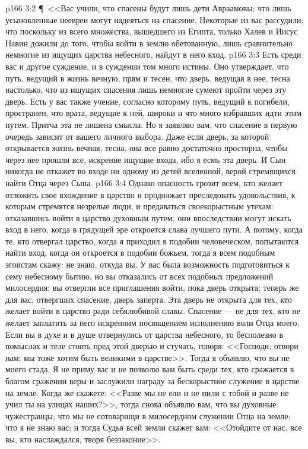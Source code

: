 \vs p166 3:2 \P\ <<Вас учили, что спасены будут лишь дети Авраамовы; что лишь усыновленные неевреи могут надеяться на спасение. Некоторые из вас рассудили, что поскольку из всего множества, вышедшего из Египта, только Халев и Иисус Навин дожили до того, чтобы войти в землю обетованную, лишь сравнительно немногие из ищущих царства небесного, найдут в него вход.
\vs p166 3:3 Есть среди вас и другое суждение, и в суждении том много истины. Оно утверждает, что путь, ведущий в жизнь вечную, прям и тесен, что дверь, ведущая в нее, тесна настолько, что из ищущих спасения лишь немногие сумеют пройти через эту дверь. Есть у вас также учение, согласно которому путь, ведущий к погибели, пространен, что врата, ведущие к ней, широки и что много избравших идти этим путем. Притча эта не лишена смысла. Но я заявляю вам, что спасение в первую очередь зависит от вашего личного выбора. Даже если дверь, за которой открывается жизнь вечная, тесна, она все равно достаточно просторна, чтобы через нее прошли все, искренне ищущие входа, ибо я есмь эта дверь. И Сын никогда не откажет во входе ни одному из детей вселенной, верой стремящихся найти Отца через Сына.
\vs p166 3:4 Однако опасность грозит всем, кто желает отложить свое вхождение в царство и продолжает преследовать удовольствия, к которым стремятся незрелые люди, и предаваться своекорыстным утехам: отказавшись войти в царство духовным путем, они впоследствии могут искать вход в него, когда в грядущей эре откроется слава лучшего пути. А потому, когда те, кто отвергал царство, когда я приходил в подобии человеческом, попытаются найти вход, когда он откроется в подобии божьем, тогда я всем подобным эгоистам скажу: не знаю, откуда вы. У вас была возможность подготовиться к сему небесному бытию, но вы отказались от всех подобных предложений милосердия; вы отвергли все приглашения войти, пока дверь открыта; теперь же для вас, отвергших спасение, дверь заперта. Эта дверь не открыта для тех, кто желает войти в царство ради себялюбивой славы. Спасение --- не для тех, кто не желает заплатить за него искренним посвящением исполнению воли Отца моего. Если вы в духе и в душе отвернулись от царства небесного, то бесполезно в помыслах и теле стоять пред этой дверью и стучать, говоря: <<Господи, отвори нам; мы тоже хотим быть великими в царстве>>. Тогда я объявлю, что вы не моего стада. Я не приму вас и не позволю вам быть среди тех, кто сражается в благом сражении веры и заслужили награду за бескорыстное служение в царстве на земле. Когда же скажете: <<Разве мы не ели и не пили с тобой и разве не учил ты на улицах наших?>>, тогда снова объявлю вам, что вы духовные чужестранцы; что мы не сотоварищи в милосердном служении Отца на земле; что я не знаю вас; и тогда Судья всей земли скажет вам: <<Отойдите от нас, все вы, кто наслаждался, творя беззаконие>>.
